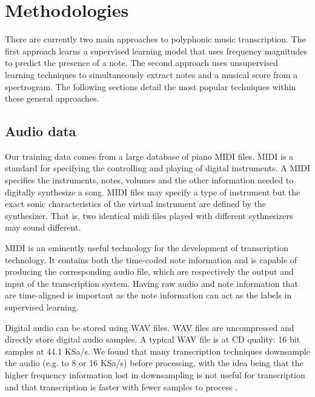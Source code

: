 \documentclass[5p]{elsarticle}
\begin{document}


\section{Methodologies}
There are currently two main approaches to polyphonic music transcription. The first approach learns a supervised learning model that uses frequency magnitudes to predict the presence of a note. The second approach uses unsupervised learning techniques to simultaneously extract notes and a musical score from a spectrogram. The following sections detail the most popular techniques within these general approaches.

\subsection{Audio data}
Our training data comes from a large database of piano MIDI files. MIDI is a standard for specifying the controlling and playing of digital instruments. A MIDI specifies the instruments, notes, volumes and the other information needed to digitally synthesize a song. MIDI files may specify a type of instrument but the exact sonic characteristics of the virtual instrument are defined by the synthesizer. That is, two identical midi files played with different sythnesizers may sound different.

MIDI is an eminently useful technology for the development of transcription technology. It contains both the time-coded note information and is capable of producing the corresponding audio file, which are respectively the output and input of the transcription system. Having raw audio and note information that are time-aligned is important as the note information can act as the labels in supervised learning.

Digital audio can be stored using WAV files. WAV files are uncompressed and directly store digital audio samples. A typical WAV file is at CD quality: 16 bit samples at 44.1 KSa/s. We found that many transcription techniques downsample the audio (e.g. to 8 or 16 KSa/s) before processing, with the idea being that the higher frequency information lost in downsampling is not useful for transcription and that transcription is faster with fewer samples to process \citet{}.
\end{document}
